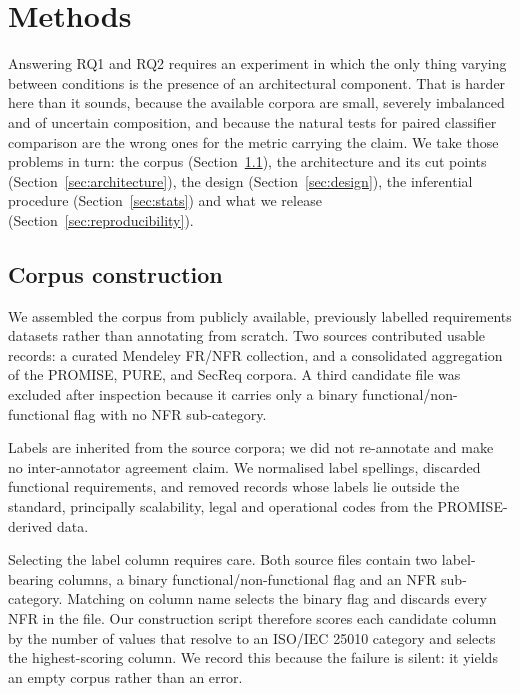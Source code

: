 \documentclass[11pt,a4paper]{article}
\begin{document}
\section{Methods}
\label{sec:methods}

Answering RQ1 and RQ2 requires an experiment in which the only thing varying between conditions is the presence of an architectural component. That is harder here than it sounds, because the available corpora are small, severely imbalanced and of uncertain composition, and because the natural tests for paired classifier comparison are the wrong ones for the metric carrying the claim. We take those problems in turn: the corpus (Section~\ref{sec:corpus}), the architecture and its cut points (Section~\ref{sec:architecture}), the design (Section~\ref{sec:design}), the inferential procedure (Section~\ref{sec:stats}) and what we release (Section~\ref{sec:reproducibility}).

\subsection{Corpus construction}
\label{sec:corpus}

We assembled the corpus from publicly available, previously labelled requirements
datasets rather than annotating from scratch. Two sources contributed usable records: a
curated Mendeley FR/NFR collection, and a consolidated aggregation of the PROMISE, PURE,
and SecReq corpora. A third candidate file was excluded after inspection because it
carries only a binary functional/non-functional flag with no NFR sub-category.

Labels are inherited from the source corpora; we did not re-annotate and make no
inter-annotator agreement claim. We normalised label spellings, discarded functional
requirements, and removed records whose labels lie outside the standard, principally
scalability, legal and operational codes from the PROMISE-derived data.

Selecting the label column requires care. Both source files contain two label-bearing columns, a binary functional/non-functional flag and an NFR sub-category. Matching on
column name selects the binary flag and discards every NFR in the file. Our construction
script therefore scores each candidate column by the number of values that resolve to an
ISO/IEC 25010 category and selects the highest-scoring column. We record this because the
failure is silent: it yields an empty corpus rather than an error.
\end{document}
